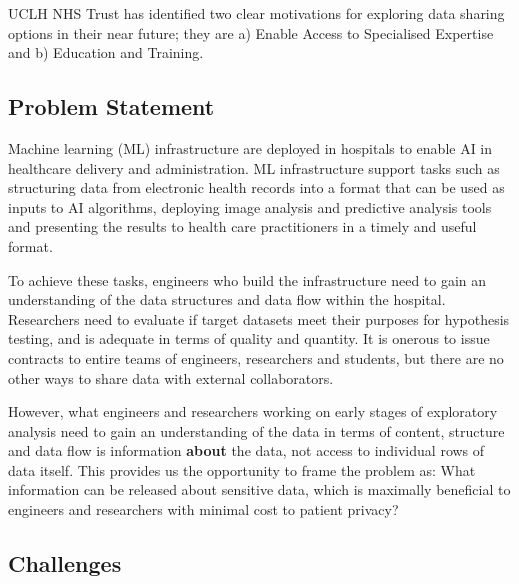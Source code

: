 \documentclass[11pt]{article}
\begin{document}
UCLH NHS Trust has identified two clear motivations for exploring data sharing options in their near future; they are a) Enable Access to Specialised Expertise and b) Education and Training. 

\subsection{Problem Statement}

Machine learning (ML) infrastructure are deployed in hospitals to enable AI in healthcare delivery and administration. ML infrastructure support tasks such as structuring data from electronic health records into a format that can be used as inputs to AI algorithms, deploying image analysis and predictive analysis tools and presenting the results to health care practitioners in a timely and useful format.

To achieve these tasks, engineers who build the infrastructure need to gain an understanding of the data structures and data flow within the hospital. Researchers need to evaluate if target datasets meet their purposes for hypothesis testing, and is adequate in terms of quality and quantity. It is onerous to issue contracts to entire teams of engineers, researchers and students, but there are no other ways to share data with external collaborators. 

However, what engineers and researchers working on early stages of exploratory analysis need to gain an understanding of the data in terms of content, structure and data flow is information \textbf{about} the data, not access to individual rows of data itself. This provides us the opportunity to frame the problem as: What information can be released about sensitive data, which is maximally beneficial to engineers and researchers with minimal cost to patient privacy?

\subsection{Challenges}
\end{document}
